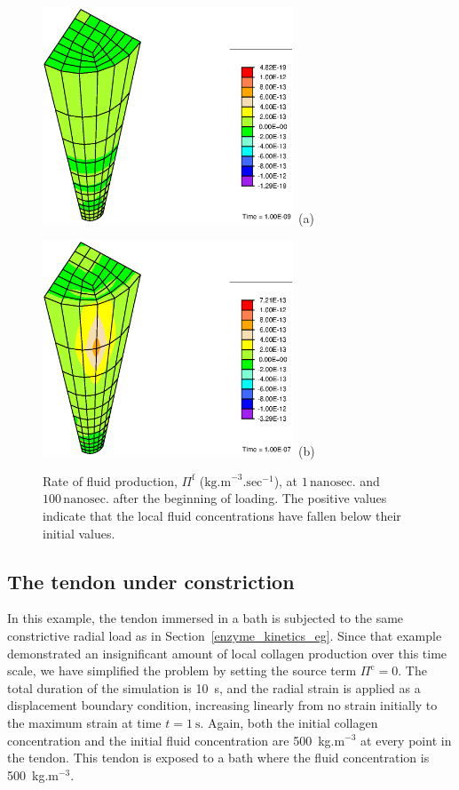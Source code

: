 \begin{figure}[!hpt]
\begin{minipage}[t]{7.5cm}
{\includegraphics[width=7.5cm]{images/examples/lagrangian/preliminary/Pi-1}} \hskip 3cm (a)
\end{minipage}
\begin{minipage}[t]{7.5cm}
{\includegraphics[width=7.5cm]{images/examples/lagrangian/preliminary/Pi-100}} \hskip 3cm (b)
\end{minipage}
\caption{Rate of fluid production, $\Pi^\mathrm{f}$
($\mathrm{kg.m}^{-3}.\mathrm{sec}^{-1}$), at $1
\,\mathrm{nanosec.}$ and $100\,\mathrm{nanosec.}$ after the
beginning of loading. The positive values indicate that the local
fluid concentrations have fallen below their initial values.}
\label{Pifig}
\end{figure}

\subsection{The tendon under constriction}
\label{constriction-1}

In this example, the tendon immersed in a bath is subjected to the same
constrictive radial load as in Section~\ref{enzyme_kinetics_eg}. Since
that example demonstrated an insignificant amount of local collagen production
over this time scale, we have simplified the
problem by setting the source term $\Pi^\mathrm{c} = 0$. The total
duration of the simulation is 
10~s, and the radial strain is applied as a displacement boundary
condition, increasing linearly from no strain initially to the maximum
strain at time $t = 1~\mathrm{s}$. Again,
both the initial collagen 
concentration and the initial fluid concentration are 500~kg.m$^{-3}$
at every point in the tendon. This tendon is exposed to a bath where
the fluid concentration is 500~kg.m$^{-3}$.

